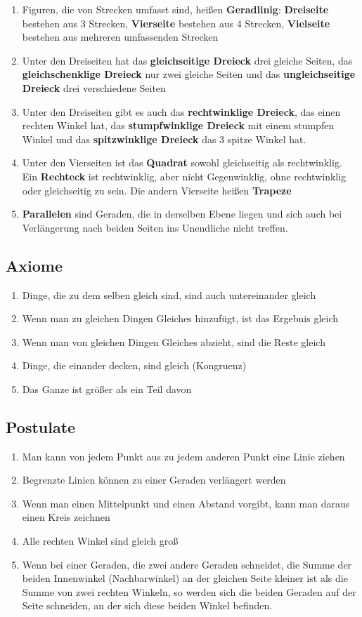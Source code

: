 \documentclass[a4paper]{article}
\begin{document}
\begin{enumerate}
		\item Figuren, die von Strecken umfasst sind, heißen \textbf{Geradlinig}: \textbf{Dreiseite} bestehen aus 3 Strecken, \textbf{Vierseite} bestehen aus 4 Strecken, \textbf{Vielseite} bestehen aus mehreren umfassenden Strecken
		\item Unter den Dreiseiten hat das \textbf{gleichseitige Dreieck} drei gleiche Seiten, das \textbf{gleichschenklige Dreieck} nur zwei gleiche Seiten und das \textbf{ungleichseitige Dreieck} drei verschiedene Seiten
		\item Unter den Dreiseiten gibt es auch das \textbf{rechtwinklige Dreieck}, das einen rechten Winkel hat, das \textbf{stumpfwinklige Dreieck} mit einem stumpfen Winkel und das \textbf{spitzwinklige Dreieck} das 3 spitze Winkel hat.
		\item Unter den Vierseiten ist das \textbf{Quadrat} sowohl gleichseitig als rechtwinklig. Ein \textbf{Rechteck} ist rechtwinklig, aber nicht Gegenwinklig, ohne rechtwinklig oder gleichseitig zu sein. Die andern Vierseite heißen \textbf{Trapeze}
		\item \textbf{Parallelen} sind Geraden, die in derselben Ebene liegen und sich auch bei Verlängerung nach beiden Seiten ins Unendliche nicht treffen.
	\end{enumerate}

	\subsection{Axiome}
	\begin{enumerate}
		\item Dinge, die zu dem selben gleich sind, sind auch untereinander gleich
		\item Wenn man zu gleichen Dingen Gleiches hinzufügt, ist das Ergebnis gleich
		\item Wenn man von gleichen Dingen Gleiches abzieht, sind die Reste gleich
		\item Dinge, die einander decken, sind gleich (Kongruenz)
		\item Das Ganze ist größer als ein Teil davon
	\end{enumerate}

	\subsection{Postulate}
	\begin{enumerate}
		\item Man kann von jedem Punkt aus zu jedem anderen Punkt eine Linie ziehen
		\item Begrenzte Linien können zu einer Geraden verlängert werden
		\item Wenn man einen Mittelpunkt und einen Abstand vorgibt, kann man daraus einen Kreis zeichnen
		\item Alle rechten Winkel sind gleich groß
		\item Wenn bei einer Geraden, die zwei andere Geraden schneidet, die Summe der beiden Innenwinkel (Nachbarwinkel) an der gleichen Seite kleiner ist als die Summe von zwei rechten Winkeln, so werden sich die beiden Geraden auf der Seite schneiden, an der sich diese beiden Winkel befinden.
	\end{enumerate}
\end{document}
